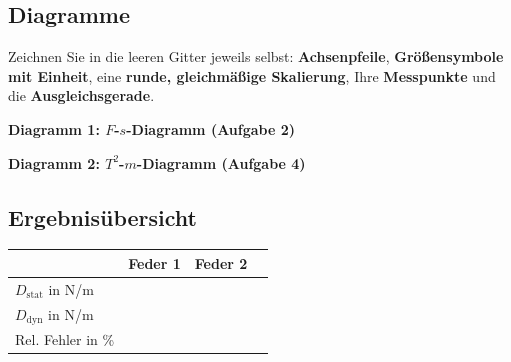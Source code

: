 \documentclass[11pt,a4paper]{scrartcl}
\begin{document}
\vspace{0.3cm}


	\newpage
	\subsection*{Diagramme}

	\begin{hilfebox}[title={\faIcon{lightbulb} Neu: Achsen und Skalierung komplett selbst}]
		Zeichnen Sie in die leeren Gitter jeweils selbst: \textbf{Achsenpfeile}, \textbf{Größensymbole mit Einheit}, eine \textbf{runde, gleichmäßige Skalierung}, Ihre \textbf{Messpunkte} und die \textbf{Ausgleichsgerade}.
	\end{hilfebox}

	\textbf{Diagramm 1: $F$-$s$-Diagramm (Aufgabe 2)}
	\begin{center}
	\end{center}

	\vspace{0.4cm}
	\textbf{Diagramm 2: $T^2$-$m$-Diagramm (Aufgabe 4)}
	\begin{center}
	\end{center}

\subsection*{Ergebnisübersicht}

\begin{center}
	\renewcommand{\arraystretch}{2.0}
	\begin{tabular}{|p{3cm}|p{3cm}|p{3cm}|p{3cm}|}
		\hline
		& \centering\textbf{Feder 1} & \centering\textbf{Feder 2} & \centering\arraybackslash \\
		\hline
		$D_{\text{stat}}$ in N/m & & & \\
		\hline
		$D_{\text{dyn}}$ in N/m & & & \\
		\hline
		Rel. Fehler in \% & & & \\
		\hline
	\end{tabular}
\end{center}
\end{document}
